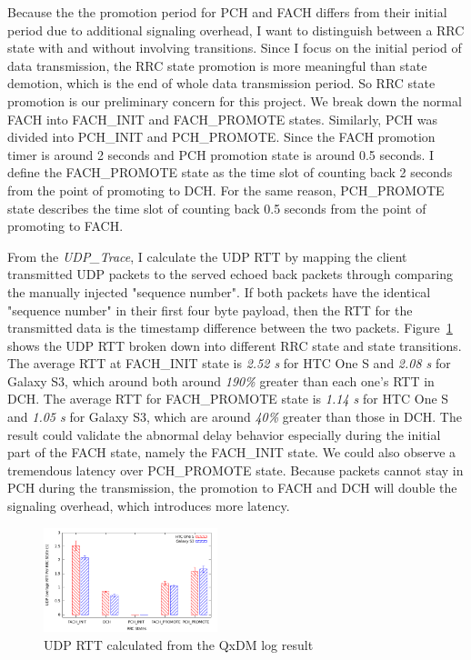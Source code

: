 Because the the promotion period for PCH and FACH differs from their initial period due to additional signaling overhead, I want to distinguish between a RRC state with and without involving transitions. Since I focus on the initial period of data transmission, the RRC state promotion is more meaningful than state demotion, which is the end of whole data transmission period. So RRC state promotion is our preliminary concern for this project. We break down the normal FACH into FACH\_{}INIT and FACH\_{}PROMOTE states. Similarly, PCH was divided into PCH\_{}INIT and PCH\_{}PROMOTE. Since the FACH promotion timer is around 2 seconds and PCH promotion state is around 0.5 seconds. I define the FACH\_{}PROMOTE state as the time slot of counting back 2 seconds from the point of promoting to DCH. For the same reason, PCH\_{}PROMOTE state describes the time slot of counting back 0.5 seconds from the point of promoting to FACH. 

From the \emph{UDP\_{}Trace}, I calculate the UDP RTT by mapping the client transmitted UDP packets to the served echoed back packets through comparing the manually injected "sequence number". If both packets have the identical "sequence number" in their first four byte payload, then the RTT for the transmitted data is the timestamp difference between the two packets. Figure~\ref{fig:udp.rtt} shows the UDP RTT broken down into different RRC state and state transitions. The average RTT at FACH\_{}INIT state is \textit{2.52 s} for HTC One S and \textit{2.08 s} for Galaxy S3, which around both around \textit{190\%} greater than each one's RTT in DCH. The average RTT for FACH\_{}PROMOTE state is \textit{1.14 s} for HTC One S and \textit{1.05 s} for Galaxy S3, which are around \textit{40\%} greater than those in DCH. The result could validate the abnormal delay behavior especially during the initial part of the FACH state, namely the FACH\_{}INIT state. We could also observe a tremendous latency over PCH\_{}PROMOTE state. Because packets cannot stay in PCH during the transmission, the promotion to FACH and DCH will double the signaling overhead, which introduces more latency.

\begin{figure}
\centering
\includegraphics[width=0.45\textwidth]{figs/udp_rtt.png}
\caption{UDP RTT calculated from the QxDM log result}
\label{fig:udp.rtt}
\end{figure}

